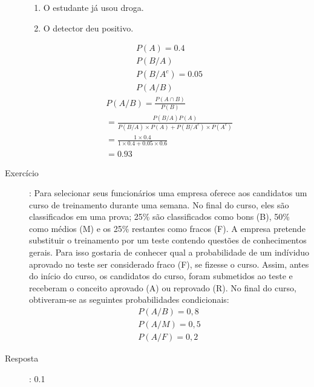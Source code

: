 \documentclass[11pt,a4paper]{book}
\begin{document}
\begin{description}
       \begin{enumerate}[label=\Alph*:]
         \item  O estudante já usou droga.
         \item  O detector deu positivo.
       \end{enumerate}
       \begin{align*}
         P(A)= 0.4 \\
         P( B / A ) \\
         P(B / A^c) = 0.05\\
         P(A / B)
       \end{align*}
       \begin{align*}
         P(A/B)= \frac{P(A \cap B)}{P(B)} \\
         = \frac{P(B/A)P(A)}{P(B/A)\times P(A) + P(B/A^c) \times P(A^c)}\\
         = \frac{1 \times 0.4}{1 \times 0.4 + 0.05 \times 0.6}\\
         =0.93
       \end{align*}
     \item  [Exercício]: Para selecionar seus funcionários uma empresa oferece aos candidatos 
       um curso de treinamento durante uma semana. No final do curso, eles são classificados
       em uma prova; 25\% são classificados como bons (B), 50\% como médios (M) e os 
       25\% restantes como fracos (F). A empresa pretende substituir o treinamento por um teste 
       contendo questões de conhecimentos gerais. Para isso gostaria de conhecer qual a 
       probabilidade de um indíviduo aprovado no teste ser considerado fraco (F), se 
       fizesse o curso. Assim, antes do início do curso, os candidatos do curso, foram 
       submetidos ao teste e receberam o conceito aprovado (A) ou reprovado (R). No final 
       do curso, obtiveram-se as seguintes probabilidades condicionais: 
       \begin{align*}
         P(A/B)= 0,8\\
         P(A/M) = 0,5\\
         P(A/F)=0,2
       \end{align*}
     \item [Resposta]: 0.1
   \end{description}
\end{document}
